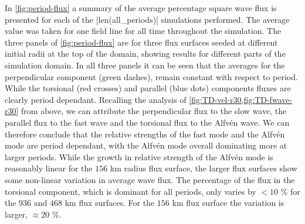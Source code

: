 In \cref{fig:period-flux} a summary of the average percentage square wave flux is presented for each of the \py[chapter6]|len(all_periods)| simulations performed.
The average value was taken for one field line for all time throughout the simulation.
The three panels of \cref{fig:period-flux} are for three flux surfaces seeded at different initial radii at the top of the domain, showing results for different parts of the simulation domain.
In all three panels it can be seen that the averages for the perpendicular component (green dashes), remain constant with respect to period.
While the torsional (red crosses) and parallel (blue dots) components fluxes are clearly period dependant.
Recalling the analysis of \cref{fig:TD-vel-r30,fig:TD-fwave-r30} from above, we can attribute the perpendicular flux to the slow wave, the parallel flux to the fast wave and the torsional flux to the Alfv\'en wave.
We can therefore conclude that the relative strengths of the fast mode and the Alfv\'en mode are period dependant, with the Alfv\'en mode overall dominating more at larger periods.
While the growth in relative strength of the Alfv\'en mode is reasonably linear for the $156$ km radius flux surface, the larger flux surfaces show some non-linear variation in average wave flux. 
The percentage of the flux in the torsional component, which is dominant for all periods, only varies by $<10$ \% for the $936$ and $468$ km flux surfaces.
For the $156$ km flux surface the variation is larger, $\approx 20$ \%.

